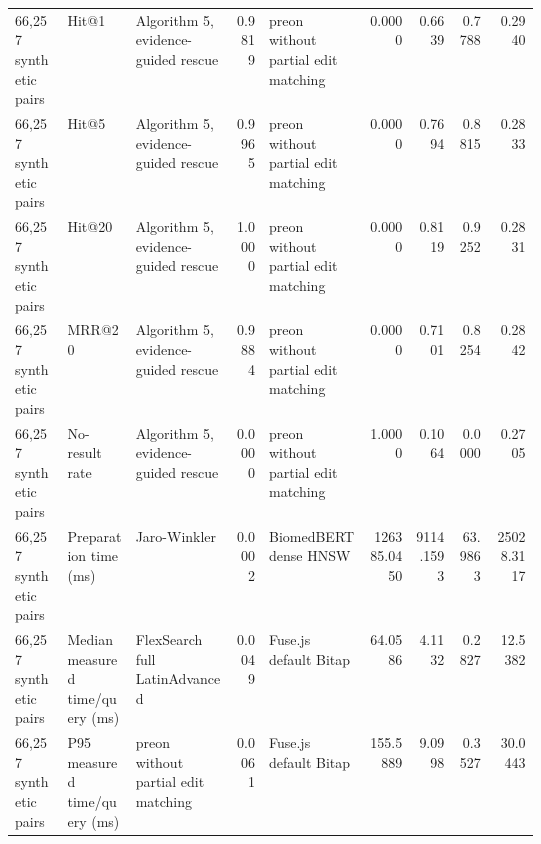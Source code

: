 \begin{landscape}
\begin{tiny}
\begin{longtable}{@{}L{0.10\linewidth}L{0.13\linewidth}L{0.19\linewidth}rL{0.19\linewidth}rrrr@{}}
66,257 synthetic pairs & Hit@1 & Algorithm 5, evidence-guided rescue & 0.9819 & preon without partial edit matching & 0.0000 & 0.6639 & 0.7788 & 0.2940 \\
66,257 synthetic pairs & Hit@5 & Algorithm 5, evidence-guided rescue & 0.9965 & preon without partial edit matching & 0.0000 & 0.7694 & 0.8815 & 0.2833 \\
66,257 synthetic pairs & Hit@20 & Algorithm 5, evidence-guided rescue & 1.0000 & preon without partial edit matching & 0.0000 & 0.8119 & 0.9252 & 0.2831 \\
66,257 synthetic pairs & MRR@20 & Algorithm 5, evidence-guided rescue & 0.9884 & preon without partial edit matching & 0.0000 & 0.7101 & 0.8254 & 0.2842 \\
66,257 synthetic pairs & No-result rate & Algorithm 5, evidence-guided rescue & 0.0000 & preon without partial edit matching & 1.0000 & 0.1064 & 0.0000 & 0.2705 \\
66,257 synthetic pairs & Preparation time (ms) & Jaro-Winkler & 0.0002 & BiomedBERT dense HNSW & 126385.0450 & 9114.1593 & 63.9863 & 25028.3117 \\
66,257 synthetic pairs & Median measured time/query (ms) & FlexSearch full LatinAdvanced & 0.0049 & Fuse.js default Bitap & 64.0586 & 4.1132 & 0.2827 & 12.5382 \\
66,257 synthetic pairs & P95 measured time/query (ms) & preon without partial edit matching & 0.0061 & Fuse.js default Bitap & 155.5889 & 9.0998 & 0.3527 & 30.0443 \\
\bottomrule
\end{longtable}
\end{tiny}

\end{landscape}

